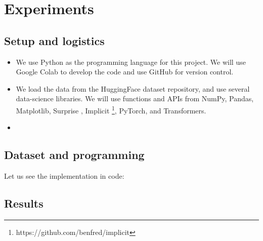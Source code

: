 \documentclass{article}
\begin{document}
\section{Experiments}
\subsection{Setup and logistics}
\begin{itemize}
    \item We use Python as the programming language for this project. We will use Google Colab to develop the code and use GitHub for version control.
    \item We load the data from the HuggingFace dataset repository, and use several data-science libraries. We will use functions and APIs from NumPy, Pandas, Matplotlib, Surprise \cite{surprise}, Implicit \footnote{https://github.com/benfred/implicit}, PyTorch, and Transformers.
    \item 
\end{itemize}

\subsection{Dataset and programming}

Let us see the implementation in code:





\subsection{Results}
\end{document}

